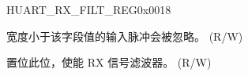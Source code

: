 \begin{register}{H}{UART\_RX\_FILT\_REG}{0x{}0018}\label{regdesc:UARTRXFILTREG}
%
%
%
\regnewline%
\begin{regdesc}\begin{reglist}
\label{fielddesc:UARTGLITCHFILT}\item [UART\_GLITCH\_FILT] 宽度小于该字段值的输入脉冲会被忽略。 (R/W)
\label{fielddesc:UARTGLITCHFILTEN}\item [UART\_GLITCH\_FILT\_EN] 置位此位，使能 RX 信号滤波器。 (R/W)
\end{reglist}\end{regdesc}
\end{register}


